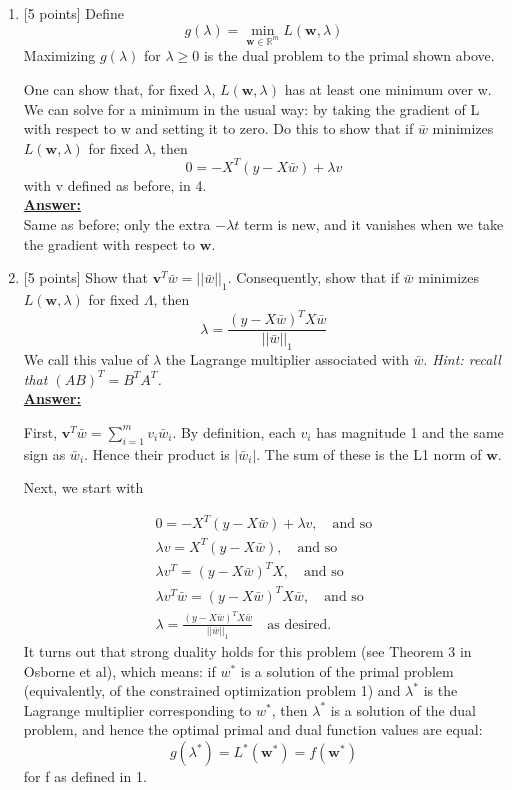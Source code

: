 \documentclass{article}
\renewcommand{\vec}[1]{\boldsymbol{#1}}
\newenvironment{qparts}{\begin{enumerate}[1.]}{\end{enumerate}}
\begin{document}
\begin{qparts}
\item {[}5 points{]}
Define
\begin{equation}
g(\lambda)=\min_{\vec{w}\in\mathbb{R}^m}L(\vec{w}, \lambda)
\end{equation}
Maximizing $g(\lambda)$ for $\lambda\geq 0$ is the dual problem to the primal shown above.

One can show that, for fixed $\lambda$, $L(\vec{w}, \lambda)$ has at least one minimum over w. We can solve for a minimum in the usual way: by taking the gradient of L with respect to w and setting it to zero. Do this to show that if $\bar{w}$ minimizes $L(\vec{w}, \lambda)$ for fixed $\lambda$, then
\begin{equation}
0=-X^T(y-X\bar{w})+\lambda v
\end{equation}
with v defined as before, in 4.\\
\underline{\textbf{Answer:}}\\
{\color{blue}
Same as before; only the extra $-\lambda t$ term is new, and it vanishes when we take the
gradient with respect to $\vec{w}$.
}

\item {[}5 points{]}
Show that $\vec{v}^T\bar{w}=||\bar{w}||_1$. Consequently, show that if $\bar{w}$ minimizes $L(\vec{w}, \lambda)$ for fixed $\Lambda$, then
\begin{equation}
\lambda=\frac{(y-X\bar{w})^TX\bar{w}}{||\bar{w}||_1}
\end{equation}
We call this value of $\lambda$ the Lagrange multiplier associated with $\bar{w}$. \textit{Hint: recall that $(AB)^T=B^TA^T$.}\\
\underline{\textbf{Answer:}}\\
{\color{blue}
First, $\vec{v}^T\bar{w}=\sum^m_{i=1}v_i\bar{w}_i$. By definition, each $v_i$ has magnitude 1 and the same sign as $\bar{w}_i$. Hence their product is $|\bar{w}_i|$. The sum of these is the L1 norm of $\vec{w}$.

Next, we start with

\begin{gather}
0=-X^T(y-X\bar{w})+\lambda v, \quad\text{and so} \\
\lambda v=X^T(y-X\bar{w}), \quad\text{and so} \\
\lambda v^T=(y-X\bar{w})^TX, \quad\text{and so} \\
\lambda v^T\bar{w}=(y-X\bar{w})^TX\bar{w}, \quad\text{and so} \\
\lambda=\frac{(y-X\bar{w})^TX\bar{w}}{||\bar{w}||_1}\quad\text{as desired.}
\end{gather}
It turns out that strong duality holds for this problem (see Theorem 3 in Osborne et al), which means: if $w^*$ is a solution of the primal problem (equivalently, of the constrained optimization problem 1) and $\lambda^*$ is the Lagrange multiplier corresponding to $w^*$, then $\lambda^*$ is a solution of the dual problem, and hence
the optimal primal and dual function values are equal:
\begin{equation}
g(\lambda^*)=L^*(\vec{w}^*)=f(\vec{w}^*)
\end{equation}
for f as defined in 1.

}
\end{qparts}
\end{document}

